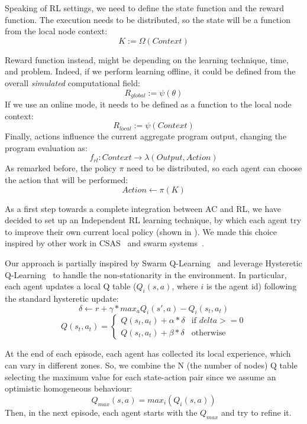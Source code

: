 \documentclass[conference]{IEEEtran}
\begin{document}
Speaking of RL settings, we need to define the state function and the reward function.
%
The execution needs to be distributed, so the state will be a function from the local node context:
$$
K := \Omega(\textit{Context})
$$

Reward function instead, might be depending on the learning technique, time, and problem. 
 Indeed, if we perform learning offline, it could be defined from the overall \textit{simulated} computational field:
$$
\textit{R}_{global} := \psi({\theta})
$$
If we use an online mode, it needs to be defined as a function to the local node context:
$$
\textit{R}_{local} := \psi(\textit{Context})
$$
Finally, actions influence the current aggregate program output, changing the program evaluation as:
$$
f_{rl} : \textit{Context} \rightarrow \lambda(\textit{Output}, \textit{Action})
$$
As remarked before, the policy $\pi$ need to be distributed, so each agent can choose the action that will be performed:
$$
\textit{Action} \leftarrow \pi(K)
$$

As a first step towards a complete integration between AC and RL, we have decided to set up an Independent RL learning technique, 
 by which each agent try to improve their own current local policy (shown in ). 
% 
We made this choice inspired by other work in CSAS~\cite{csas-and-marl} and swarm systems~\cite{nguyen2018swarm}.

Our approach is partially inspired by Swarm Q-Learning~\cite{nguyen2018swarm} and leverage Hysteretic Q-Learning~\cite{hysteretic-q} to
 handle the non-stationarity in the environment.
%
In particular, each agent updates a local Q table ($Q_i(s, a)$, where $i$ is the agent id) following the standard hysteretic update:
$$
\delta \leftarrow r + \gamma * max_a Q_i(s', a) - Q_i(s_t, a_t)
$$
$$
Q(s_t, a_t) =  \begin{cases} 
  Q(s_t, a_t) + \alpha * \delta & \mbox{if } delta >= 0 \\ 
  Q(s_t, a_t) + \beta * \delta & \mbox{otherwise }
\end{cases}
$$

At the end of each episode, each agent has collected its local experience, which can vary in different zones. 
 So, we combine the N (the number of nodes) Q table selecting the maximum value for each state-action pair since we assume an optimistic homogeneous behaviour:
$$
Q_{max}(s, a) = max_i(Q_i(s, a))
$$
Then, in the next episode, each agent starts with the $Q_{max}$ and try to refine it.
\end{document}
